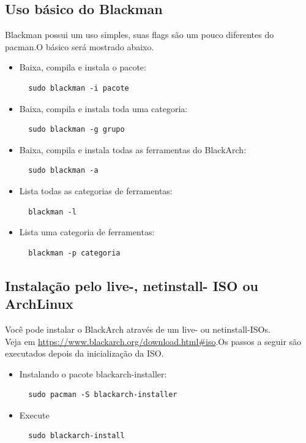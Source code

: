 \documentclass[a4paper, oneside, 11pt]{book}
\begin{document}
\subsection{Uso básico do Blackman} Blackman possui um uso simples, suas flags são um pouco diferentes do pacman.O básico será mostrado abaixo.
\begin{itemize}
\item Baixa, compila e instala o pacote:
\begin{lstlisting}
  sudo blackman -i pacote
\end{lstlisting}

\item Baixa, compila e instala toda uma categoria:
\begin{lstlisting}
  sudo blackman -g grupo
\end{lstlisting}

\item Baixa, compila e instala todas as ferramentas do BlackArch:
\begin{lstlisting}
  sudo blackman -a
\end{lstlisting}

\item Lista todas as categorias de ferramentas:
\begin{lstlisting}
  blackman -l
\end{lstlisting}

\item Lista uma categoria de ferramentas:
\begin{lstlisting}
  blackman -p categoria 
\end{lstlisting}

\end{itemize}

\subsection{Instalação pelo live-, netinstall- ISO ou ArchLinux}
Você pode instalar o BlackArch através de um live- ou netinstall-ISOs.\\Veja em
\url{https://www.blackarch.org/download.html#iso}.Os passos a seguir são executados depois da inicialização da ISO.
\begin{itemize}
\item Instalando o pacote blackarch-installer:
\begin{lstlisting}
  sudo pacman -S blackarch-installer
\end{lstlisting}

\item Execute
\begin{lstlisting}
  sudo blackarch-install
\end{lstlisting}

\end{itemize}
\end{document}
